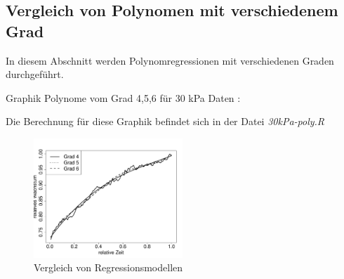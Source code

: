 \documentclass[12pt,a4paper]{article}
\theoremstyle{definition}
\theoremstyle{definition}
\theoremstyle{definition}
\theoremstyle{definition}
\begin{document}
%
%
%
%
%
%
%
%
%




\subsection{Vergleich von Polynomen mit verschiedenem Grad}
In diesem Abschnitt werden Polynomregressionen mit verschiedenen Graden durchgeführt.

Graphik Polynome vom Grad 4,5,6 für 30 kPa Daten :

Die Berechnung für diese Graphik befindet sich in der Datei \textit{30kPa-poly.R}

\begin{figure}[H] 
  \centering
     \includegraphics[width=0.5\textwidth]{30kPa-poly.pdf}
  \caption{Vergleich von Regressionsmodellen}
  \label{fig:11}
\end{figure}
\end{document}
